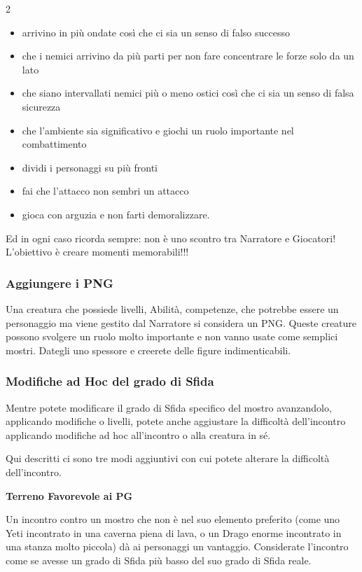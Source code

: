 \begin{multicols}{2}
\begin{itemize}[leftmargin=*]
\item arrivino in più ondate così che ci sia un senso di falso successo
\item che i nemici arrivino da più parti per non fare concentrare le forze solo da un lato
\item che siano intervallati nemici più o meno ostici così che ci sia un senso di falsa sicurezza
\item che l'ambiente sia significativo e giochi un ruolo importante nel combattimento
\item dividi i personaggi su più fronti
\item fai che l'attacco non sembri un attacco
\item gioca con arguzia e non farti demoralizzare.
\end{itemize}

Ed in ogni caso ricorda sempre: non è uno scontro tra Narratore e Giocatori! L'obiettivo è creare momenti memorabili!!!

\subsubsection{Aggiungere i PNG}

Una creatura che possiede livelli, Abilità, competenze, che potrebbe essere un personaggio ma viene gestito dal Narratore si considera un PNG. Queste creature possono svolgere un ruolo molto importante e non vanno usate come semplici mostri. Dategli uno spessore e creerete delle figure indimenticabili.

\subsubsection{Modifiche ad Hoc del grado di Sfida}

Mentre potete modificare il grado di Sfida specifico del mostro avanzandolo, applicando modifiche o livelli, potete anche aggiustare la difficoltà dell'incontro applicando modifiche ad hoc all'incontro o alla creatura in sé.

Qui descritti ci sono tre modi aggiuntivi con cui potete alterare la difficoltà dell'incontro.

\medskip

\textbf{Terreno Favorevole ai PG}

Un incontro contro un mostro che non è nel suo elemento preferito (come uno Yeti incontrato in una caverna piena di lava, o un Drago enorme incontrato in una stanza molto piccola) dà ai personaggi un vantaggio. Considerate l'incontro come se avesse un grado di Sfida più basso del suo grado di Sfida reale.


\end{multicols}
